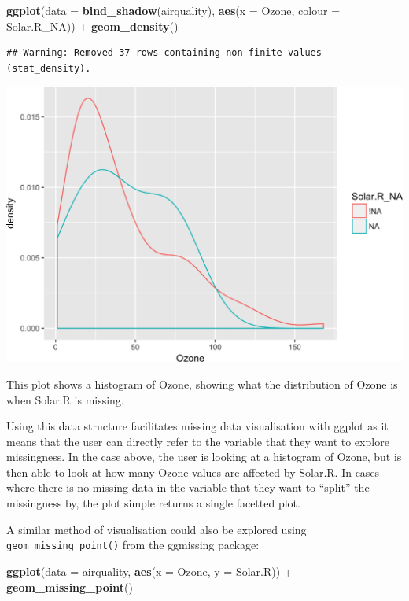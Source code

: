 \documentclass[]{article}
\newenvironment{Shaded}{\begin{snugshade}}{\end{snugshade}}
\newcommand{\KeywordTok}[1]{\textcolor[rgb]{0.13,0.29,0.53}{\textbf{{#1}}}}
\newcommand{\DataTypeTok}[1]{\textcolor[rgb]{0.13,0.29,0.53}{{#1}}}
\newcommand{\StringTok}[1]{\textcolor[rgb]{0.31,0.60,0.02}{{#1}}}
\newcommand{\NormalTok}[1]{{#1}}
\begin{document}
\begin{Shaded}
\begin{Highlighting}[]
\KeywordTok{ggplot}\NormalTok{(}\DataTypeTok{data =} \KeywordTok{bind_shadow}\NormalTok{(airquality),}
       \KeywordTok{aes}\NormalTok{(}\DataTypeTok{x =} \NormalTok{Ozone,}
           \DataTypeTok{colour =} \NormalTok{Solar.R_NA)) +}\StringTok{ }
\StringTok{  }\KeywordTok{geom_density}\NormalTok{()}
\end{Highlighting}
\end{Shaded}

\begin{verbatim}
## Warning: Removed 37 rows containing non-finite values (stat_density).
\end{verbatim}

\includegraphics{jsm2017_files/figure-latex/unnamed-chunk-2-2.png}

This plot shows a histogram of Ozone, showing what the distribution of
Ozone is when Solar.R is missing.

Using this data structure facilitates missing data visualisation with
ggplot as it means that the user can directly refer to the variable that
they want to explore missingness. In the case above, the user is looking
at a histogram of Ozone, but is then able to look at how many Ozone
values are affected by Solar.R. In cases where there is no missing data
in the variable that they want to ``split'' the missingness by, the plot
simple returns a single facetted plot.

A similar method of visualisation could also be explored using
\texttt{geom\_missing\_point()} from the ggmissing package:

\begin{Shaded}
\begin{Highlighting}[]
\KeywordTok{ggplot}\NormalTok{(}\DataTypeTok{data =} \NormalTok{airquality,}
       \KeywordTok{aes}\NormalTok{(}\DataTypeTok{x =} \NormalTok{Ozone,}
           \DataTypeTok{y =} \NormalTok{Solar.R)) +}\StringTok{ }
\StringTok{  }\KeywordTok{geom_missing_point}\NormalTok{()}
\end{Highlighting}
\end{Shaded}
\end{document}
